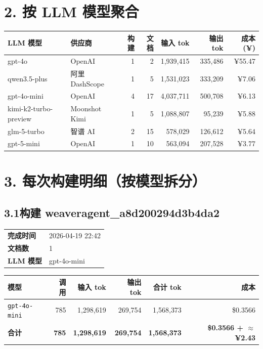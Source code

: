 \documentclass[11pt]{article}
\begin{document}
\section*{2. 按 LLM 模型聚合}
\noindent\begin{tabularx}{\textwidth}{@{}X l r r r r r@{}}
\toprule
\rowcolor{headerbg!10}\textbf{LLM 模型} & \textbf{供应商} & \textbf{构建} & \textbf{文档} & \textbf{输入 tok} & \textbf{输出 tok} & \textbf{成本(¥)} \\
\midrule
\rowcolor{rowalt}\small gpt-4o & \small OpenAI & 1 & 2 & 1{,}939{,}415 & 335{,}486 & ¥55.47 \\
\small qwen3.5-plus & \small 阿里 DashScope & 1 & 5 & 1{,}531{,}023 & 333{,}209 & ¥7.06 \\
\rowcolor{rowalt}\small gpt-4o-mini & \small OpenAI & 4 & 17 & 4{,}037{,}711 & 500{,}708 & ¥6.13 \\
\small kimi-k2-turbo-preview & \small Moonshot Kimi & 1 & 5 & 1{,}088{,}807 & 95{,}239 & ¥5.88 \\
\rowcolor{rowalt}\small glm-5-turbo & \small 智谱 AI & 2 & 15 & 578{,}029 & 126{,}612 & ¥5.64 \\
\small gpt-5-mini & \small OpenAI & 1 & 10 & 563{,}094 & 207{,}528 & ¥3.77 \\
\bottomrule
\end{tabularx}
\vspace{0.1cm}
\section*{3. 每次构建明细（按模型拆分）}
\subsection*{3.1\;构建 weaveragent\_a8d200294d3b4da2}
\noindent\begin{minipage}{\textwidth}
\begin{tabular}{@{}ll@{}}
\textbf{完成时间} & 2026-04-19 22:42 \\
\textbf{文档数} & 1 \\
\textbf{LLM 模型} & gpt-4o-mini \\
\end{tabular}
\end{minipage}
\par\vspace{0.25cm}
\noindent\begin{tabularx}{\textwidth}{@{}X r r r r r@{}}
\toprule
\rowcolor{headerbg!10}\textbf{模型} & \textbf{调用} & \textbf{输入 tok} & \textbf{输出 tok} & \textbf{合计 tok} & \textbf{成本} \\
\midrule
\rowcolor{rowalt}\texttt{\small gpt-4o-mini} & 785 & 1{,}298{,}619 & 269{,}754 & 1{,}568{,}373 & \$0.3566 \\
\midrule
\rowcolor{headerbg!15}\textbf{合计} & \textbf{785} & \textbf{1{,}298{,}619} & \textbf{269{,}754} & \textbf{1{,}568{,}373} & \textbf{\$0.3566 + $\approx$ ¥2.43} \\
\bottomrule
\end{tabularx}
\vspace{0.5cm}
\end{document}
